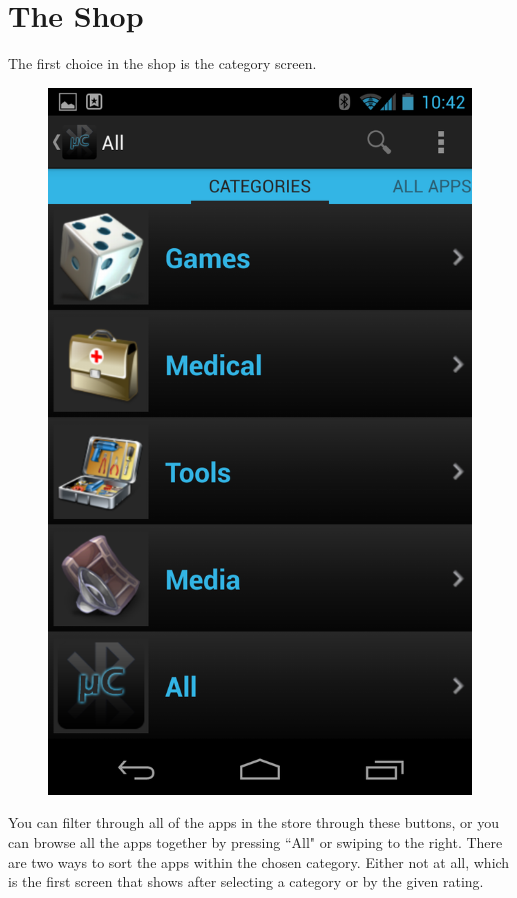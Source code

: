 \chapter{The Shop}
The first choice in the shop is the category screen.\\
\newline
\begin{figure}[H]
	\centering
	\includegraphics[scale = 0.3]{images/Screenshots/category_view.png}
\end{figure}
You can filter through all of the apps in the store through these buttons, or you can browse all the apps together by pressing ``All" or swiping to the right. There are two ways to sort the apps within the chosen category. Either not at all, which is the first screen that shows after selecting a category or by the given rating. \\
